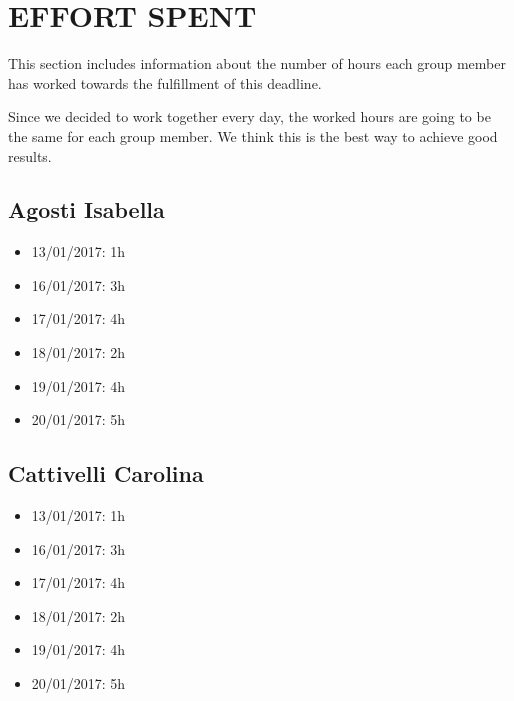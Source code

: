 \section{EFFORT SPENT}
This section includes information about the number of hours each group member has worked towards the fulfillment of this deadline. 

Since we decided to work together every day, the worked hours are going to be the same for each group member. We think this is the best way to achieve good results.  

\subsection{Agosti Isabella}
\begin{itemize}
	\item 13/01/2017: 1h
	\item 16/01/2017: 3h
	\item 17/01/2017: 4h
	\item 18/01/2017: 2h
	\item 19/01/2017: 4h
	\item 20/01/2017: 5h
\end{itemize}
\subsection{Cattivelli Carolina}
\begin{itemize}
	\item 13/01/2017: 1h
	\item 16/01/2017: 3h
	\item 17/01/2017: 4h
	\item 18/01/2017: 2h
	\item 19/01/2017: 4h
	\item 20/01/2017: 5h
\end{itemize}